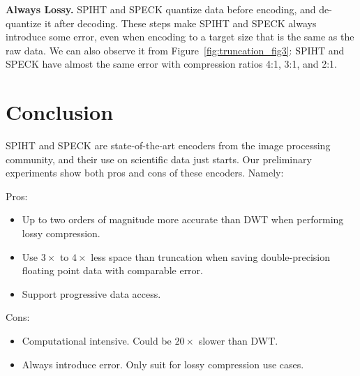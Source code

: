\documentclass[review]{vgtc}                 %
\newenvironment{tightItemize}{
\begin{itemize}
        \setlength{\itemsep}{1pt}
        \setlength{\parskip}{0pt}
        \setlength{\parsep}{0pt}
}{\end{itemize}
}
\begin{document}
\textbf{Always Lossy.}
%
SPIHT and SPECK quantize data before encoding,
and de-quantize it after decoding.
%
These steps make SPIHT and SPECK always introduce some error,
even when encoding to a target size that is the same as the raw data.
%
We can also observe it from Figure~\ref{fig:truncation_fig3}:
SPIHT and SPECK have almost the same error with compression ratios
4:1, 3:1, and 2:1.


\section{Conclusion}
%
SPIHT and SPECK are state-of-the-art encoders from the image processing
community, and their use on scientific data just starts.
%
Our preliminary experiments show both pros and cons of these encoders. 
Namely:

Pros:
\begin{tightItemize}
    \item Up to two orders of magnitude more accurate than DWT
          when performing lossy compression.
    \item Use $3\times$ to $4\times$ less space than truncation
          when saving double-precision floating point data with
          comparable error.
    \item Support progressive data access. 
\end{tightItemize}

Cons:
\begin{tightItemize}
    \item Computational intensive. Could be $20\times$ slower than DWT.
    \item Always introduce error. Only suit for lossy compression use cases.
\end{tightItemize}




\end{document}
